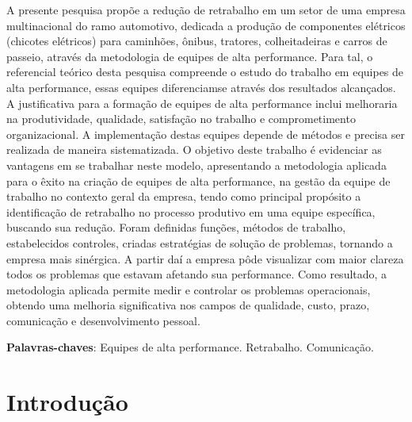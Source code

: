 \documentclass[
	12pt,
	openright,
	oneside, %
	a4paper,
	chapter=TITLE,
	section=TITLE,
	english,
	brazil %
	]{abntex2-udesc}
\begin{document}
\begin{resumo}
A presente pesquisa propõe a redução de retrabalho em um setor de uma empresa
multinacional do ramo automotivo, dedicada a produção de componentes elétricos (chicotes
elétricos) para caminhões, ônibus, tratores, colheitadeiras e carros de passeio, através da
metodologia de equipes de alta performance. Para tal, o referencial teórico desta pesquisa
compreende o estudo do trabalho em equipes de alta performance, essas equipes diferenciamse
através dos resultados alcançados. A justificativa para a formação de equipes de alta
performance inclui melhoraria na produtividade, qualidade, satisfação no trabalho e
comprometimento organizacional. A implementação destas equipes depende de métodos e
precisa ser realizada de maneira sistematizada. O objetivo deste trabalho é evidenciar as
vantagens em se trabalhar neste modelo, apresentando a metodologia aplicada para o êxito na
criação de equipes de alta performance, na gestão da equipe de trabalho no contexto geral da
empresa, tendo como principal propósito a identificação de retrabalho no processo produtivo
em uma equipe específica, buscando sua redução. Foram definidas funções, métodos de
trabalho, estabelecidos controles, criadas estratégias de solução de problemas, tornando a
empresa mais sinérgica. A partir daí a empresa pôde visualizar com maior clareza todos os
problemas que estavam afetando sua performance. Como resultado, a metodologia aplicada
permite medir e controlar os problemas operacionais, obtendo uma melhoria significativa nos
campos de qualidade, custo, prazo, comunicação e desenvolvimento pessoal.

\vspace{\onelineskip}
\textbf{Palavras-chaves}: Equipes de alta performance. Retrabalho. Comunicação.
\end{resumo}

\listoffigures*
\cleardoublepage

\listofquadros*
\cleardoublepage

\listoftables*
\cleardoublepage

\tableofcontents*
\cleardoublepage


\textual
\pagestyle{simple}

\chapter{Introdução}
\end{document}
